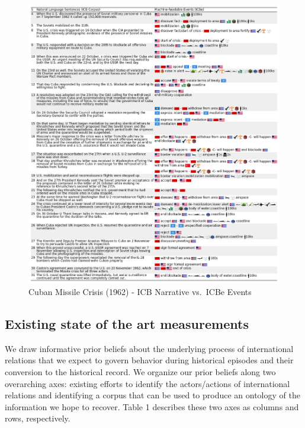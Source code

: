 \documentclass{article}
\begin{document}
\begin{figure}
\hypertarget{fig-cuba-narrative}{%
\centering
\includegraphics{case_study_cuban_precision.png}
\caption{Cuban Missile Crisis (1962) - ICB Narrative vs.~ICBe
Events}\label{fig-cuba-narrative}
}
\end{figure}

\hypertarget{existing-state-of-the-art-measurements}{%
\subsection{Existing state of the art
measurements}\label{existing-state-of-the-art-measurements}}

We draw informative prior beliefs about the underlying process of
international relations that we expect to govern behavior during
historical episodes and their conversion to the historical record. We
organize our prior beliefs along two overarching axes: existing efforts
to identify the actors/actions of international relations and
identifying a corpus that can be used to produce an ontology of the
information we hope to recover. Table 1 describes these two axes as
columns and rows, respectively.
\end{document}
